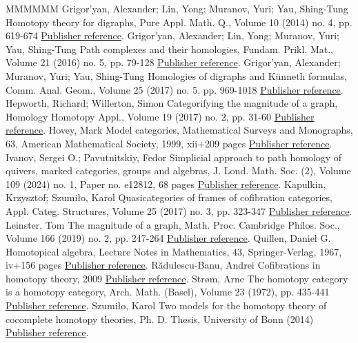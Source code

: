 \documentclass[11pt]{article}
\theoremstyle{definition}
\numberwithin{equation}{section}
\begin{document}
\begin{thebibliography}{MMMMMM}
 Grigor’yan, Alexander; Lin, Yong; Muranov, Yuri; Yau, Shing-Tung Homotopy theory for digraphs, Pure Appl. Math. Q., Volume 10 (2014) no. 4, pp. 619-674 \href{https://alco.centre-mersenne.org/articles/10.5802/alco.341/#grigor'yan-lin-muranov-yau:homotopy}{Publisher reference}.
 Grigor’yan, Alexander; Lin, Yong; Muranov, Yuri; Yau, Shing-Tung Path complexes and their homologies, Fundam. Prikl. Mat., Volume 21 (2016) no. 5, pp. 79-128 \href{https://alco.centre-mersenne.org/articles/10.5802/alco.341/#grigor'yan-lin-muranov-yau}{Publisher reference}.
 Grigor’yan, Alexander; Muranov, Yuri; Yau, Shing-Tung Homologies of digraphs and Künneth formulas, Comm. Anal. Geom., Volume 25 (2017) no. 5, pp. 969-1018 \href{https://alco.centre-mersenne.org/articles/10.5802/alco.341/#grigor'yan-muranov-yau}{Publisher reference}.
 Hepworth, Richard; Willerton, Simon Categorifying the magnitude of a graph, Homology Homotopy Appl., Volume 19 (2017) no. 2, pp. 31-60 \href{https://alco.centre-mersenne.org/articles/10.5802/alco.341/#hepworth-willerton}{Publisher reference}.
 Hovey, Mark Model categories, Mathematical Surveys and Monographs, 63, American Mathematical Society, 1999, xii+209 pages \href{https://alco.centre-mersenne.org/articles/10.5802/alco.341/#hovey:book}{Publisher reference}.
 Ivanov, Sergei O.; Pavutnitskiy, Fedor Simplicial approach to path homology of quivers, marked categories, groups and algebras, J. Lond. Math. Soc. (2), Volume 109 (2024) no. 1, Paper no. e12812, 68 pages \href{https://alco.centre-mersenne.org/articles/10.5802/alco.341/#ivanov-pavutniskiy}{Publisher reference}.
 Kapulkin, Krzysztof; Szumiło, Karol Quasicategories of frames of cofibration categories, Appl. Categ. Structures, Volume 25 (2017) no. 3, pp. 323-347 \href{https://alco.centre-mersenne.org/articles/10.5802/alco.341/#kapulkin-szumilo}{Publisher reference}.
 Leinster, Tom The magnitude of a graph, Math. Proc. Cambridge Philos. Soc., Volume 166 (2019) no. 2, pp. 247-264 \href{https://alco.centre-mersenne.org/articles/10.5802/alco.341/#leinster:magnitude-graph}{Publisher reference}.
 Quillen, Daniel G. Homotopical algebra, Lecture Notes in Mathematics, 43, Springer-Verlag, 1967, iv+156 pages \href{https://alco.centre-mersenne.org/articles/10.5802/alco.341/#quillen:book}{Publisher reference}.
 Rădulescu-Banu, Andrei Cofibrations in homotopy theory, 2009 \href{https://alco.centre-mersenne.org/articles/10.5802/alco.341/#radulescu-banu}{Publisher reference}.
 Strøm, Arne The homotopy category is a homotopy category, Arch. Math. (Basel), Volume 23 (1972), pp. 435-441 \href{https://alco.centre-mersenne.org/articles/10.5802/alco.341/#strom}{Publisher reference}.
 Szumiło, Karol Two models for the homotopy theory of cocomplete homotopy theories, Ph. D. Thesis, University of Bonn (2014) \href{https://alco.centre-mersenne.org/articles/10.5802/alco.341/#szumilo:two-models}{Publisher reference}.
\end{thebibliography}
\end{document}

